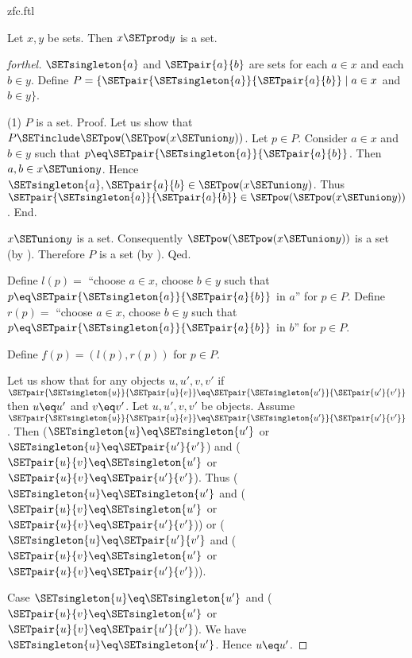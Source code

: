 \documentclass{naproche-library}
\begin{document}
\begin{smodule}[title=ZFC]{zfc.ftl}
\begin{proposition}[forthel,id=FOUNDATIONS_10_4458706448154624]
  Let $x, y$ be sets.
  Then $x \SETprod y$ is a set.
\end{proposition}
\begin{proof}[forthel]
  $\SETsingleton{a}$ and $\SETpair{a}{b}$ are sets for each $a \in x$ and each $b \in y$.
  Define $P = \{ \SETpair{\SETsingleton{a}}{\SETpair{a}{b}} \mid a \in x$ and $b \in y \}$.

  (1) $P$ is a set. \newline
  Proof.
    Let us show that $P \SETinclude \SETpow(\SETpow(x \SETunion y))$.
      Let $p \in P$.
      Consider $a \in x$ and $b \in y$ such that $p \eq \SETpair{\SETsingleton{a}}{\SETpair{a}{b}}$.
      Then $a, b \in x \SETunion y$.
      Hence $\SETsingleton{a}, \SETpair{a}{b} \in \SETpow(x \SETunion y)$.
      Thus $\SETpair{\SETsingleton{a}}{\SETpair{a}{b}} \in \SETpow(\SETpow(x \SETunion y))$.
    End.

    $x \SETunion y$ is a set.
    Consequently $\SETpow(\SETpow(x \SETunion y))$ is a set (by ).
    Therefore $P$ is a set (by ).
  Qed.

  Define $l(p) =$ ``choose $a \in x$, choose $b \in y$ such that $p \eq \SETpair{\SETsingleton{a}}{\SETpair{a}{b}}$ in $a$'' for $p \in P$.
  Define $r(p) =$ ``choose $a \in x$, choose $b \in y$ such that $p \eq \SETpair{\SETsingleton{a}}{\SETpair{a}{b}}$ in $b$'' for $p \in P$.

  Define $f(p) = (l(p), r(p))$ for $p \in P$.

  Let us show that for any objects $u, u', v, v'$ if
  $\SETpair{\SETsingleton{u}}{\SETpair{u}{v}} \eq \SETpair{\SETsingleton{u'}}{\SETpair{u'}{v'}}$ then $u \eq u'$ and $v \eq v'$.
    Let $u, u', v, v'$ be objects.
    Assume $\SETpair{\SETsingleton{u}}{\SETpair{u}{v}} \eq \SETpair{\SETsingleton{u'}}{\SETpair{u'}{v'}}$.
    Then ($\SETsingleton{u} \eq \SETsingleton{u'}$ or $\SETsingleton{u} \eq \SETpair{u'}{v'}$) and ($\SETpair{u}{v} \eq \SETsingleton{u'}$ or $\SETpair{u}{v} \eq \SETpair{u'}{v'}$).
    Thus ($\SETsingleton{u} \eq \SETsingleton{u'}$ and ($\SETpair{u}{v} \eq \SETsingleton{u'}$ or $\SETpair{u}{v} \eq \SETpair{u'}{v'}$)) or ($\SETsingleton{u} \eq \SETpair{u'}{v'}$ and ($\SETpair{u}{v} \eq \SETsingleton{u'}$ or $\SETpair{u}{v} \eq \SETpair{u'}{v'}$)).

    Case $\SETsingleton{u} \eq \SETsingleton{u'}$ and ($\SETpair{u}{v} \eq \SETsingleton{u'}$ or $\SETpair{u}{v} \eq \SETpair{u'}{v'}$).
      We have $\SETsingleton{u} \eq \SETsingleton{u'}$.
      Hence $u \eq u'$.


\end{proof}
\end{smodule}
\end{document}
